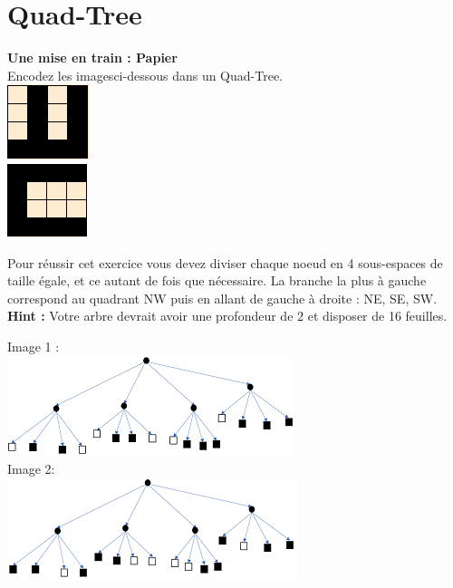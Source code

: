 \newpage

\section{Quad-Tree}
\begin{Exercice}[10 minutes]\textbf{Une mise en train : Papier}\\

Encodez les imagesci-dessous dans un Quad-Tree.\\

\includegraphics[]{Quad-Tree 1.PNG}\\
\includegraphics[]{Quad-Tree 2.PNG}

\begin{conseil}
    Pour réussir cet exercice vous devez diviser chaque noeud en 4 sous-espaces de taille égale, et ce autant de fois que nécessaire. La branche la plus à gauche correspond au quadrant NW puis en allant de gauche à droite : NE, SE, SW.\\
    
    \textbf{Hint :} Votre arbre devrait avoir une profondeur de 2 et disposer de 16 feuilles.
\end{conseil}
\begin{solution}
Image 1 :\\
    \includegraphics[]{Quad-Tree 1 Solution.PNG}\\
    
Image 2: \\
    \includegraphics[]{Quad-Tree 2 Solution.PNG}
\end{solution}
\end{Exercice}
